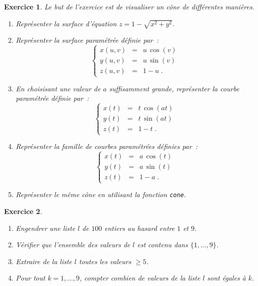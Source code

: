\documentclass{article}
\newtheorem{exo}{Exercice}[section]
\begin{document}
\begin{exo}{\rm
Le but de l'exercice est de visualiser un c\^one de diff\'erentes
mani\`eres.
\begin{enumerate}
\item
Repr\'esenter la surface d'\'equation $z=1-\sqrt{x^2+y^2}$.
\item
Repr\'esenter la surface param\'etr\'ee d\'efinie par~:
$$
\left\{
\begin{array}{lcl}
x(u,v)&=& u\,\cos(v)\\
y(u,v)&=& u\,\sin(v)\\
z(u,v)&=& 1-u\;.
\end{array}
\right.
$$
\item
En choisisant une valeur de $a$ suffisamment grande, repr\'esenter la courbe 
param\'etr\'ee d\'efinie par~: 
$$
\left\{
\begin{array}{lcl}
x(t)&=& t\,\cos(a t)\\
y(t)&=& t\,\sin(a t)\\
z(t)&=& 1-t\;.
\end{array}
\right.
$$

\item
Repr\'esenter la famille de courbes param\'etr\'ees d\'efinies par~: 
$$
\left\{
\begin{array}{lcl}
x(t)&=& a\,\cos(t)\\
y(t)&=& a\,\sin(t)\\
z(t)&=& 1-a\;.
\end{array}
\right.
$$
\item 
Repr\'esenter le m\^eme c\^one en utilisant la fonction \verb|cone|.
\end{enumerate} 
}\end{exo}
\begin{exo}{\rm ~
\begin{enumerate}
\item
Engendrer une liste $l$ de $100$ entiers au hasard entre $1$ et $9$.
\item
V\'erifier que l'ensemble des valeurs de $l$ est contenu dans
$\{1,\ldots,9\}$.
\item
Extraire de la liste $l$ toutes les valeurs $\geq 5$.
\item
Pour tout $k=1,\ldots,9$, compter combien de valeurs de la liste $l$ 
sont \'egales \`a $k$. 
\end{enumerate} 
}\end{exo}
\end{document}

